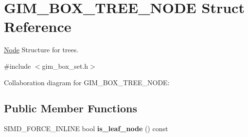 \hypertarget{struct_g_i_m___b_o_x___t_r_e_e___n_o_d_e}{\section{G\+I\+M\+\_\+\+B\+O\+X\+\_\+\+T\+R\+E\+E\+\_\+\+N\+O\+D\+E Struct Reference}
\label{struct_g_i_m___b_o_x___t_r_e_e___n_o_d_e}
}


\hyperlink{struct_node}{Node} Structure for trees.  




{\ttfamily \#include $<$gim\+\_\+box\+\_\+set.\+h$>$}



Collaboration diagram for G\+I\+M\+\_\+\+B\+O\+X\+\_\+\+T\+R\+E\+E\+\_\+\+N\+O\+D\+E\+:
\subsection*{Public Member Functions}
\begin{DoxyCompactItemize}
\item 
\hypertarget{struct_g_i_m___b_o_x___t_r_e_e___n_o_d_e_a536dbd11bc7f2a5496077beb1bdb543e}{S\+I\+M\+D\+\_\+\+F\+O\+R\+C\+E\+\_\+\+I\+N\+L\+I\+N\+E bool {\bfseries is\+\_\+leaf\+\_\+node} () const }\label{struct_g_i_m___b_o_x___t_r_e_e___n_o_d_e_a536dbd11bc7f2a5496077beb1bdb543e}

\end{DoxyCompactItemize}
